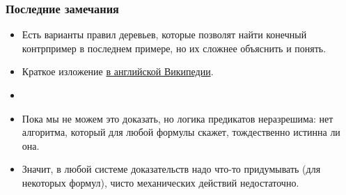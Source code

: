 \documentclass[10pt]{beamer}
\begin{document}
\begin{frame}
\frametitle{Последние замечания}
\begin{itemize}
    \item Есть варианты правил деревьев, которые позволят найти конечный контрпример в последнем примере, но их сложнее объяснить и понять.
    \item Краткое изложение \href{https://en.wikipedia.org/wiki/Method_of_analytic_tableaux\#First-order_tableau_with_unification}{в английской Википедии}. \pause
    \item[]
    \item Пока мы не можем это доказать, но логика предикатов неразрешима: нет алгоритма, который для любой формулы скажет, тождественно истинна ли она.
    \item Значит, в любой системе доказательств надо что-то придумывать (для некоторых формул), чисто механических действий недостаточно.
\end{itemize}
\end{frame}
\end{document}
